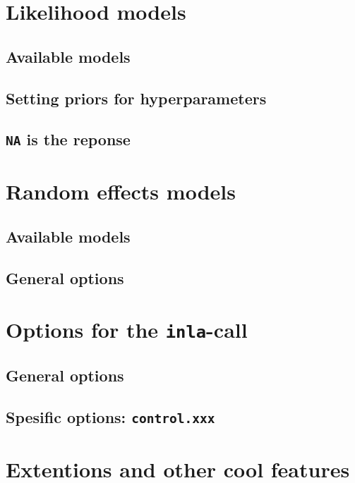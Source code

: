 \documentclass[a4paper,11pt]{report}
\newcommand{\tv}{\texttt}
\begin{document}
\chapter{Likelihood models}

\section{Available models}

\section{Setting priors for hyperparameters}

\section{\tv{NA} is the reponse}



\chapter{Random effects models}

\section{Available models}

\section{General options}



\chapter{Options for the \tv{inla}-call}

\section{General options}
\section{Spesific options: \tv{control.xxx}}



\chapter{Extentions and other cool features}
\end{document}
